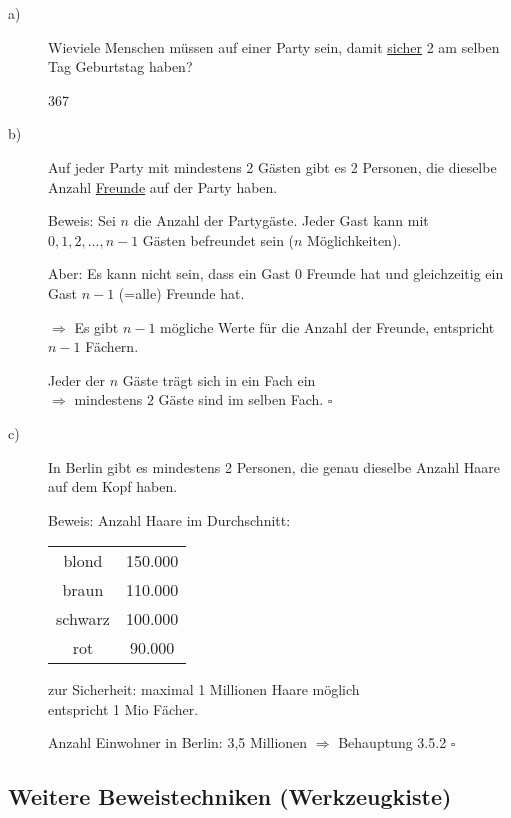\documentclass[a4paper, 12pt, twoside] {article}
\begin{document}
\begin{description}
\item[a)]
Wieviele Menschen müssen auf einer Party sein, damit \underline{sicher} 2 am selben Tag Geburtstag haben?

367

\item[b)]
Auf jeder Party mit mindestens 2 Gästen gibt es 2 Personen, die dieselbe Anzahl \underline{Freunde} auf der Party haben.

Beweis: Sei $n$ die Anzahl der Partygäste. Jeder Gast kann mit $0, 1, 2, ..., n-1$ Gästen befreundet sein ($n$ Möglichkeiten).

Aber: Es kann nicht sein, dass ein Gast $0$ Freunde hat und gleichzeitig ein Gast $n-1$ (=alle) Freunde hat.

$\Rightarrow$ Es gibt $n-1$ mögliche Werte für die Anzahl der Freunde, entspricht $n-1$ Fächern.

Jeder der $n$ Gäste trägt sich in ein Fach ein \\
$\Rightarrow$ mindestens $2$ Gäste sind im selben Fach. \hfill $\square$

\item[c)]
In Berlin gibt es mindestens 2 Personen, die genau dieselbe Anzahl Haare auf dem Kopf haben.

Beweis: Anzahl Haare im Durchschnitt:

\begin{tabular}{ c c }
blond & 150.000 \\
braun & 110.000 \\
schwarz & 100.000 \\
rot & 90.000
\end{tabular}

zur Sicherheit: maximal 1 Millionen Haare möglich \\
entspricht 1 Mio Fächer.

Anzahl Einwohner in Berlin: 3,5 Millionen $\Rightarrow$ Behauptung 3.5.2 \hfill $\square$

\end{description}

\subsection{Weitere Beweistechniken (Werkzeugkiste)}
\end{document}
